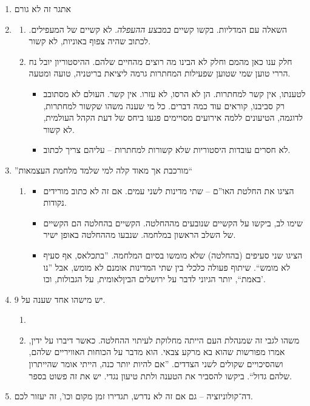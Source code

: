 \documentclass[]{../../../../tex/classes/styledArticle}
\begin{document}
\begin{enumerate}
		\item אתגר זה לא גורם
		\item \begin{enumerate}[A']
			\item השאלה עם המדליות. בקשו קשיים \textit{במבצע ההעפלה}. לא קשיים של המעפילים. לכתוב שהיה צפוף באוניות, לא קשור. 
			\item חלק ענו כאן מהמם וחלק לא הבינו מה רוצים מהחיים שלהם. ההיסטוריון יובל נח הררי טוען שמי שטוען שפעילות המחתרות גרמה ליציאת בריטניה, טועה ומטעה. 
			\begin{itemize}
				\item לטענתו, אין קשר למחתרות. הן לא הרסו, לא עזרו. אין קשר. העולם לא מסתובב רק סביבנו, קוראים עוד כמה דברים. כל מי שענה משהו שקשור למחתרות, לדוגמה, הטיעונים ללמה אירועים מסויימים פגעו ביחס של דעת הקהל העולמית, לא קשור. 
				\item לא חסרים עובדות היסטוריות שלא קשורות למחתרות – עליהם צריך לכתוב. 
			\end{itemize}
		\end{enumerate}
		\item ''מורכבת אך מאוד קלה למי שלמד מלחמת העצמאות`` \begin{enumerate}[A']
			\item \begin{itemize}
				\item הציגו את החלטת האו''ם – שתי מדינות לשני עמים. אם זה לא כתוב מורידים נקודות. 
				\item שימו לב, ביקשו על הקשיים שנובעים מההחלטה. הקשיים בהחלטה הם הקשיים של השלב הראשון במלחמה. שנבעו מההחלטה באופן ישיר. 
				\item הציגו שני סעיפים (בהחלטה) שלא מומשו בסיום המלחמה. ''בתכלאס, אף סעיף לא מומש``. שיתוף פעולה כלכלי בין שתי המדינות אומנם לא מומש, אבל ''נו באמת``, יותר הגיוני לדבר על ירושלים הביןלאומית, על הגבולות, וכו'. 
			\end{itemize}
		\end{enumerate}
		\item יש מישהו אחד שענה על 9. 
		\begin{enumerate}[A']
			\item 
			\item משהו לגבי זה שמנהלת העם הייתה מחלוקת לעיתוי ההחלטה. כאשר דיברו על ידין, אמרו מפורשות שהוא בא מרקע צבאי. הוא מדבר על הכוחות האוויריים שלהם, ושהסיכויים שקולים לשני הצדדים. ''אם להיות יותר כנה, הייתי אומר שהייתרון שלהם גדול``. ביקשו להסביר את הטענה ולתת טיעון נגדי. יש את זה פשוט בספר. 
		\end{enumerate}
		\item דה־קולוניזציה – גם אם זה לא נדרש, תגדירו זמן מקום וכו', זה יעזור לכם. 

\end{enumerate}
\end{document}

